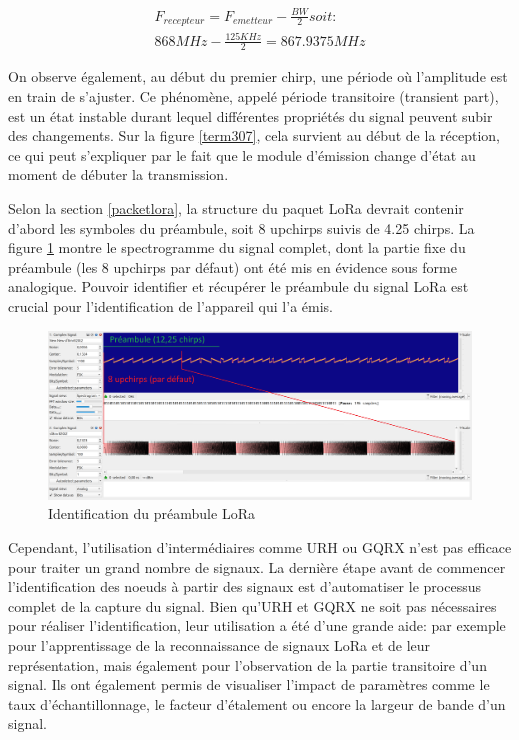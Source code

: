 \begin{align}
    F_{recepteur} = F_{emetteur} - \frac{BW}{2} soit: \\
    868MHz - \frac{125KHz}{2} = 867.9375MHz
\end{align}

On observe également, au début du premier chirp, une période où l'amplitude est en train de s'ajuster. Ce phénomène, appelé période transitoire (transient part), est un état instable durant lequel différentes propriétés du signal peuvent subir des changements. Sur la figure \ref{term307}, cela survient au début de la réception, ce qui peut s'expliquer par le fait que le module d'émission change d'état au moment de débuter la transmission.

\vspace{0.1cm}

Selon la section \ref{packetlora}, la structure du paquet \ac{LoRa} devrait contenir d'abord les symboles du préambule, soit 8 upchirps suivis de 4.25 chirps. La figure \ref{term308} montre le spectrogramme du signal complet, dont la partie fixe du préambule (les 8 upchirps par défaut) ont été mis en évidence sous forme analogique. Pouvoir identifier et récupérer le préambule du signal \ac{LoRa} est crucial pour l'identification de l'appareil qui l'a émis.


\begin{figure}[h]
\centering

\includegraphics[scale=0.18]{images/urh6.png}
\caption{Identification du préambule LoRa}\label{term308}
\end{figure}

Cependant, l'utilisation d'intermédiaires comme \ac{URH} ou GQRX n'est pas efficace pour traiter un grand nombre de signaux. La dernière étape avant de commencer l'identification des noeuds à partir des signaux est d'automatiser le processus complet de la capture du signal. Bien qu'\ac{URH} et GQRX ne soit pas nécessaires pour réaliser l'identification, leur utilisation a été d'une grande aide: par exemple pour l'apprentissage de la reconnaissance de signaux \ac{LoRa} et de leur représentation, mais également pour l'observation de la partie transitoire d'un signal. Ils ont également permis de visualiser l'impact de paramètres comme le taux d'échantillonnage, le facteur d'étalement ou encore la largeur de bande d'un signal.

